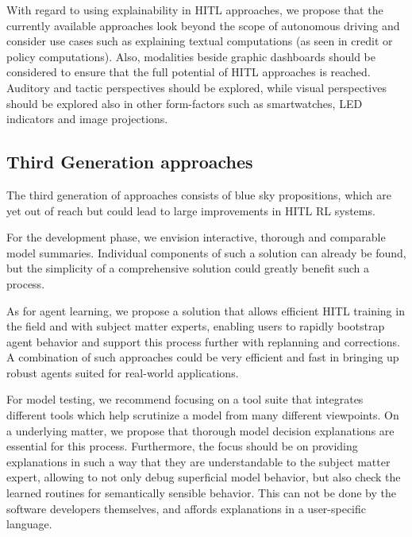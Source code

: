 \documentclass[twoside,11pt]{article}
\begin{document}

With regard to using explainability in HITL approaches, we propose that the currently available approaches look beyond the scope of autonomous driving and consider use cases such as explaining textual computations (as seen in credit or policy computations). Also, modalities beside graphic dashboards should be considered to ensure that the full potential of HITL approaches is reached. Auditory and tactic perspectives should be explored, while visual perspectives should be explored also in other form-factors such as smartwatches, LED indicators and image projections.

\subsection{Third Generation approaches}


The third generation of approaches consists of blue sky propositions, which are yet out of reach but could lead to large improvements in HITL RL systems.


For the development phase, we envision interactive, thorough and comparable model summaries. Individual components of such a solution can already be found, but the simplicity of a comprehensive solution could greatly benefit such a process.


As for agent learning, we propose a solution that allows efficient HITL training in the field and with subject matter experts, enabling users to rapidly bootstrap agent behavior and support this process further with replanning and corrections. A combination of such approaches could be very efficient and fast in bringing up robust agents suited for real-world applications.


For model testing, we recommend focusing on a tool suite that integrates different tools which help scrutinize a model from many different viewpoints. On a underlying matter, we propose that thorough model decision explanations are essential for this process. Furthermore, the focus should be on providing explanations in such a way that they are understandable to the subject matter expert, allowing to not only debug superficial model behavior, but also check the learned routines for semantically sensible behavior. This can not be done by the software developers themselves, and affords explanations in a user-specific language.
\end{document}
